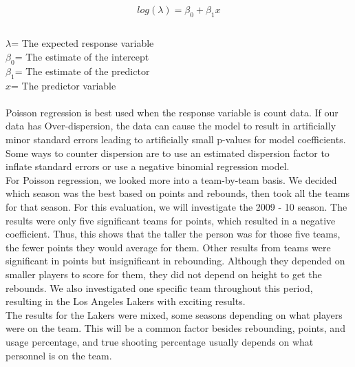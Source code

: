\documentclass[11pt,letterpaper]{amsart}
\begin{document}
\begin{align*}
log(\lambda)=\beta_0+\beta_1x\\
\end{align*}
\\
\textbf{$\lambda$}= The expected response variable\\
\textbf{$\beta_0$}= The estimate of the intercept\\
\textbf{$\beta_1$}= The estimate of the predictor\\
\textbf{$x$}= The predictor variable\\
\cite{3}\\
\indent Poisson regression is best used when the response variable is count data. If our data has Over-dispersion, the data can cause the model to result in artificially minor standard errors leading to artificially small p-values for model coefficients. Some ways to counter dispersion are to use an estimated dispersion factor to inflate standard errors or use a negative binomial regression model.\\
\indent For Poisson regression, we looked more into a team-by-team basis. We decided which season was the best based on points and rebounds, then took all the teams for that season. For this evaluation, we will investigate the 2009 - 10 season. The results were only five significant teams for points, which resulted in a negative coefficient. Thus, this shows that the taller the person was for those five teams, the fewer points they would average for them. Other results from teams were significant in points but insignificant in rebounding. Although they depended on smaller players to score for them, they did not depend on height to get the rebounds. We also investigated one specific team throughout this period, resulting in the Los Angeles Lakers with exciting results.\\
\indent The results for the Lakers were mixed, some seasons depending on what players were on the team. This will be a common factor besides rebounding, points, and usage percentage, and true shooting percentage usually depends on what personnel is on the team.\\
\end{document}
